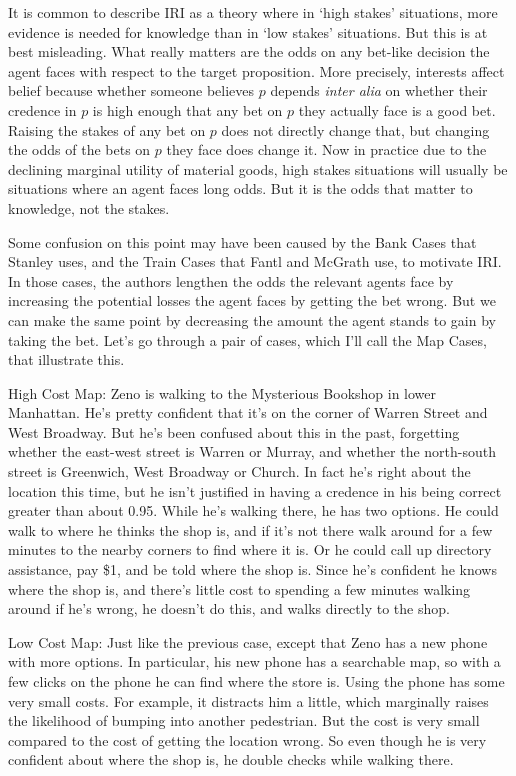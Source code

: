 \documentclass[oneside, a4paper]{book}
\begin{document}
It is common to describe IRI as a theory where in `high stakes' situations, more evidence is needed for knowledge than in `low stakes' situations. But this is at best misleading. What really matters are the odds on any bet-like decision the agent faces with respect to the target proposition. More precisely, interests affect belief because  whether someone believes \(p\) depends \textit{inter alia} on whether their credence in \(p\) is high enough that any bet on \(p\) they actually face is a good bet. Raising the stakes of any bet on \(p\) does not directly change that, but changing the odds of the bets on \(p\) they face does change it. Now in practice due to the declining marginal utility of material goods, high stakes situations will usually be situations where an agent faces long odds. But it is the odds that matter to knowledge, not the stakes.

Some confusion on this point may have been caused by the Bank Cases that Stanley uses, and the Train Cases that Fantl and McGrath use, to motivate IRI. In those cases, the authors lengthen the odds the relevant agents face by increasing the potential losses the agent faces by getting the bet wrong. But we can make the same point by decreasing the amount the agent stands to gain by taking the bet. Let's go through a pair of cases, which I'll call the Map Cases, that illustrate this.

\begin{description*}
\item[High Cost Map:] Zeno is walking to the Mysterious Bookshop in lower Manhattan. He's pretty confident that it's on the corner of Warren Street and West Broadway. But he's been confused about this in the past, forgetting whether the east-west street is Warren or Murray, and whether the north-south street is Greenwich, West Broadway or Church. In fact he's right about the location this time, but he isn't justified in having a credence in his being correct greater than about 0.95. While he's walking there, he has two options. He could walk to where he thinks the shop is, and if it's not there walk around for a few minutes to the nearby corners to find where it is. Or he could call up directory assistance, pay \$1, and be told where the shop is. Since he's confident he knows where the shop is, and there's little cost to spending a few minutes walking around if he's wrong, he doesn't do this, and walks directly to the shop.
\item[Low Cost Map:] Just like the previous case, except that Zeno has a new phone with more options. In particular, his new phone has a searchable map, so with a few clicks on the phone he can find where the store is. Using the phone has some very small costs. For example, it distracts him a little, which marginally raises the likelihood of bumping into another pedestrian. But the cost is very small compared to the cost of getting the location wrong. So even though he is very confident about where the shop is, he double checks while walking there.
\end{description*}
\end{document}
